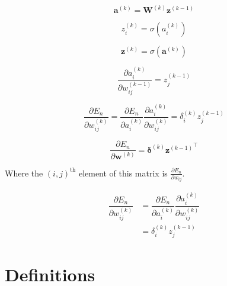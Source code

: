 \documentclass{article}
\begin{document}
\begin{equation}
    \mathbf{a}^{(k)} = \mathbf{W}^{(k)} \mathbf{z}^{(k-1)}
\end{equation}

\begin{equation}
    z_i^{(k)} = \sigma(a_i^{(k)})
\end{equation}

\begin{equation}
    \mathbf{z}^{(k)} = \sigma(\mathbf{a}^{(k)})
\end{equation}

\begin{equation}
    \dfrac{\partial a_i^{(k)}}{\partial w_{ij}^{(k-1)}} = z_j^{(k-1)}
\end{equation}


\begin{equation}
    \dfrac{\partial E_n}{\partial w_{ij}^{(k)}} = 
    \dfrac{\partial E_n}{\partial a_i^{(k)}} \dfrac{\partial a_i^{(k)}}{\partial w_{ij}^{(k)}} = \delta_i^{(k)} z_j^{(k-1)}
\end{equation}

\begin{equation}
    \dfrac{\partial E_n}{\partial \mathbf{w}^{(k)}} = \bm{\delta}^{(k)} {\mathbf{z}^{(k-1)}}^{\top}
\end{equation}

Where the $(i,j)^{\mathrm{th}}$ element of this matrix is $\frac{\partial E_n}{\partial w_{ij}}$.

\begin{equation}
\begin{split}
    \dfrac{\partial E_n}{\partial w_{ij}^{(k)}} &= 
    \dfrac{\partial E_n}{\partial a_i^{(k)}} \dfrac{\partial a_i^{(k)}}{\partial w_{ij}^{(k)}} \\
    &= \delta_i^{(k)} z_j^{(k-1)}
\end{split}
\end{equation}

\section{Definitions}
\end{document}
